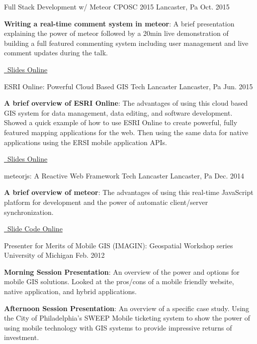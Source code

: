 \begin{cventries}
  \cventry
    {Full Stack Development w/ Meteor}
    {CPOSC 2015}
    {Lancaster, Pa}
    {Oct. 2015}
    {
      \begin{cvitems}
        \item {\textbf{Writing a real-time comment system in meteor}: A brief presentation explaining the power of meteor followed by a 20min live demonstration of building a full featured commenting system including user management and live comment updates during the talk.}
        \item {\href{http://rjfisher.github.io/CPOSC-2015-Meteor-Slides/}{\faGithubSquare\ Slides Online}}
      \end{cvitems}
    }

  \cventry
    {ESRI Online: Powerful Cloud Based GIS}
    {Tech Lancaster}
    {Lancaster, Pa}
    {Jun. 2015}
    {
      \begin{cvitems}
        \item {\textbf{A brief overview of ESRI Online}: The advantages of using this cloud based GIS system for data management, data editing, and software development.  Showed a quick example of how to use ESRI Online to create powerful, fully featured mapping applications for the web.  Then using the same data for native applications using the ERSI mobile application APIs.}
        \item {\href{http://rjfisher.github.io/TechLancaster-ESRI-Online/}{\faGithubSquare\ Slides Online}}
      \end{cvitems}
    }

  \cventry
    {meteorjs: A Reactive Web Framework}
    {Tech Lancaster}
    {Lancaster, Pa}
    {Dec. 2014}
    {
      \begin{cvitems}
        \item {\textbf{A brief overview of meteor}: The advantages of using this real-time JavaScript platform for development and the power of automatic client/server synchronization.}
        \item {\href{https://github.com/rjfisher/TechLancaster-Meteor-Talk/}{\faGithubSquare\ Slide Code Online}}
      \end{cvitems}
    }

  \cventry
    {Presenter for Merits of Mobile GIS}
    {(IMAGIN): Geospatial Workshop series}
    {University of Michigan}
    {Feb. 2012}
    {
      \begin{cvitems}
        \item {\textbf{Morning Session Presentation}: An overview of the power and options for mobile GIS solutions.  Looked at the pros/cons of a mobile friendly website, native application, and hybrid applications.}
        \item {\textbf{Afternoon Session Presentation}: An overview of a specific case study.  Using the City of Philadelphia's SWEEP Mobile ticketing system to show the power of using mobile technology with GIS systems to provide impressive returns of investment.}
      \end{cvitems}
    }
\end{cventries}
